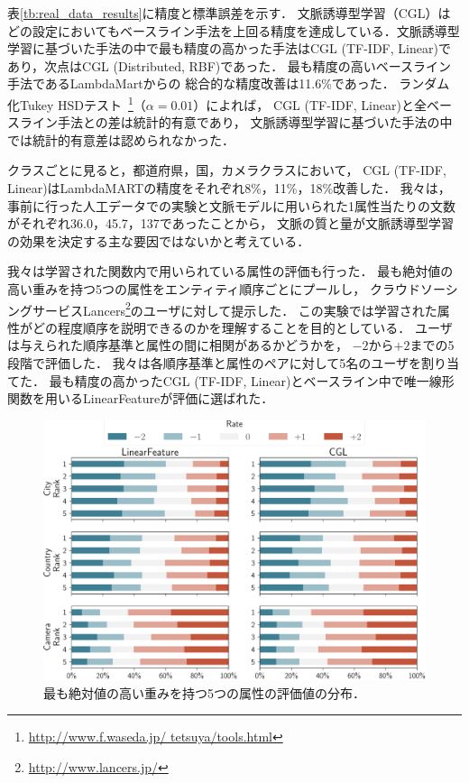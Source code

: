 表\ref{tb:real_data_results}に精度と標準誤差を示す．
文脈誘導型学習（CGL）はどの設定においてもベースライン手法を上回る精度を達成している．文脈誘導型学習に基づいた手法の中で最も精度の高かった手法はCGL (TF-IDF, Linear)であり，次点はCGL (Distributed, RBF)であった．
最も精度の高いベースライン手法であるLambdaMartからの
総合的な精度改善は11.6\%であった．
ランダム化Tukey HSDテスト~\cite{carterette2012multiple}\footnote{\url{http://www.f.waseda.jp/ tetsuya/tools.html}}（$\alpha = 0.01$）によれば，
CGL (TF-IDF, Linear)と全ベースライン手法との差は統計的有意であり，
文脈誘導型学習に基づいた手法の中では統計的有意差は認められなかった．

クラスごとに見ると，都道府県，国，カメラクラスにおいて，
CGL (TF-IDF, Linear)はLambdaMARTの精度をそれぞれ8\%，11\%，18\%改善した．
我々は，事前に行った人工データでの実験と文脈モデルに用いられた1属性当たりの文数がそれぞれ36.0，45.7，137であったことから，
文脈の質と量が文脈誘導型学習の効果を決定する主な要因ではないかと考えている．

我々は学習された関数内で用いられている属性の評価も行った．
最も絶対値の高い重みを持つ5つの属性をエンティティ順序ごとにプールし，
クラウドソーシングサービスLancers\footnote{\url{http://www.lancers.jp/}}のユーザに対して提示した．
この実験では学習された属性がどの程度順序を説明できるのかを理解することを目的としている．
ユーザは与えられた順序基準と属性の間に相関があるかどうかを，
$-2$から$+2$までの5段階で評価した．
我々は各順序基準と属性のペアに対して5名のユーザを割り当てた．
最も精度の高かったCGL (TF-IDF, Linear)とベースライン中で唯一線形関数を用いるLinearFeatureが評価に選ばれた．

\begin{figure}[t]
  \begin{center}
    \includegraphics[width=\columnwidth]{images/rates}
    \caption{最も絶対値の高い重みを持つ5つの属性の評価値の分布．}
    \label{fig:weights_evaluation_results}
  \end{center}
\end{figure}

